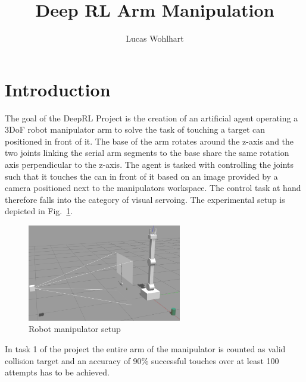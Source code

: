 \documentclass[10pt,journal,compsoc]{IEEEtran}
\begin{document}
\title{Deep RL Arm Manipulation}

\author{Lucas Wohlhart}

%
{}

\maketitle

\section{Introduction}
The goal of the DeepRL Project is the creation of an artificial agent operating a 3DoF robot manipulator arm to solve the task of touching a target can positioned in front of it. The base of the arm rotates around the z-axis and the two joints linking the serial arm segments to the base share the same rotation axis perpendicular to the z-axis.
The agent is tasked with controlling the joints such that it touches the can in front of it based on an image provided by a camera positioned next to the manipulators workspace. The control task at hand therefore falls into the category of visual servoing. The experimental setup is depicted in Fig.~\ref{fig:deep_rl_arm}.

\begin{figure}[htbp]
    \begin{center}
      \includegraphics[width=0.6\textwidth]{img/deep_rl_arm}
    \end{center}
    \caption{Robot manipulator setup}
    \label{fig:deep_rl_arm}
\end{figure}
In task 1 of the project the entire arm of the manipulator is counted as valid collision target and an accuracy of 90\% successful touches over at least 100 attempts has to be achieved.
\end{document}
